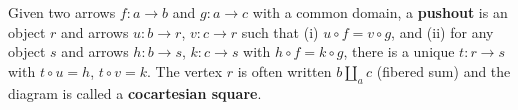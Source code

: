 Given two arrows $f: a \to b$ and $g: a \to c$ with a common domain, a \textbf{pushout} is an object $r$ and arrows $u: b \to r$, $v: c \to r$ such that (i) $u \circ f = v \circ g$, and (ii) for any object $s$ and arrows $h: b \to s$, $k: c \to s$ with $h \circ f = k \circ g$, there is a unique $t: r \to s$ with $t \circ u = h$, $t \circ v = k$. The vertex $r$ is often written $b \amalg_a c$ (fibered sum) and the diagram is called a \textbf{cocartesian square}.